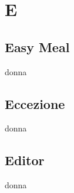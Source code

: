 \section{E} 
\subsection{Easy Meal} 
donna
\subsection{Eccezione} 
donna
\subsection{Editor} 
donna
